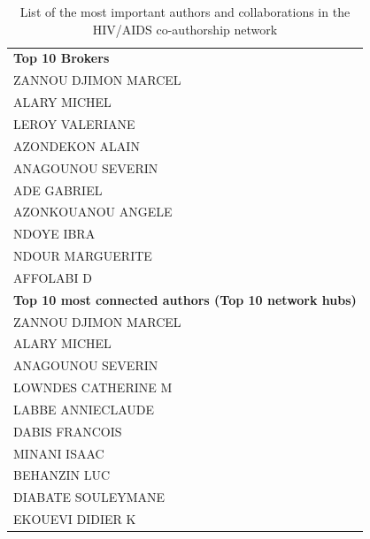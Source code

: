 \begin{table}[h!]
\caption{List of the most important authors and collaborations in the HIV/AIDS co-authorship network}
\label{table: hiv_list}
\centering \footnotesize
\begin{tabular}{l}
  \toprule
\textbf{Top 10 Brokers}\\
\hspace{20pt}ZANNOU DJIMON MARCEL\\
\hspace{20pt}ALARY MICHEL\\
\hspace{20pt}LEROY VALERIANE\\
\hspace{20pt}AZONDEKON ALAIN\\
\hspace{20pt}ANAGOUNOU SEVERIN\\
\hspace{20pt}ADE GABRIEL\\
\hspace{20pt}AZONKOUANOU ANGELE\\
\hspace{20pt}NDOYE IBRA\\
\hspace{20pt}NDOUR MARGUERITE\\
\hspace{20pt}AFFOLABI D\\
\hline
\textbf{Top 10 most connected authors (Top 10 network hubs)}\\
\hspace{20pt}ZANNOU DJIMON MARCEL\\
\hspace{20pt}ALARY MICHEL\\
\hspace{20pt}ANAGOUNOU SEVERIN\\
\hspace{20pt}LOWNDES CATHERINE M\\
\hspace{20pt}LABBE ANNIECLAUDE\\
\hspace{20pt}DABIS FRANCOIS\\
\hspace{20pt}MINANI ISAAC\\
\hspace{20pt}BEHANZIN LUC\\
\hspace{20pt}DIABATE SOULEYMANE\\
\hspace{20pt}EKOUEVI DIDIER K\\

\end{tabular}
\end{table}
